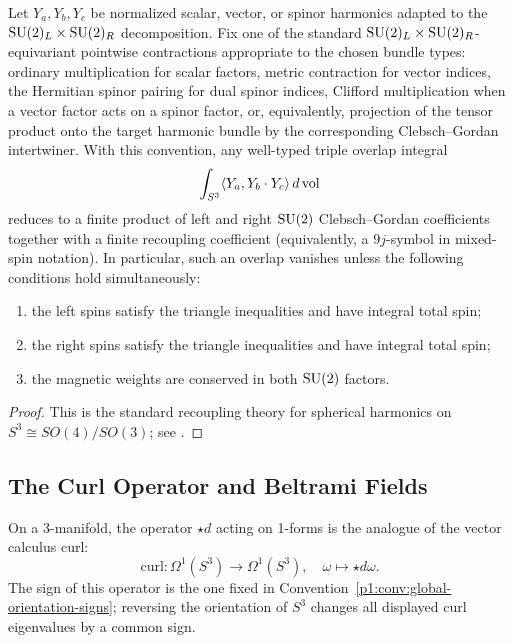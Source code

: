 \documentclass[11pt]{article}
\begin{document}
\begin{proposition}
\label{p1a:proposition:atlas-triple-overlap-coefficients-9f2b958}

Let \(Y_a,Y_b,Y_c\) be normalized scalar, vector, or spinor harmonics adapted to the \(\mathrm{SU}(2)_L\times \mathrm{SU}(2)_R\) decomposition.  Fix one of the standard \(\mathrm{SU}(2)_L\times\mathrm{SU}(2)_R\)-equivariant pointwise contractions appropriate to the chosen bundle types: ordinary multiplication for scalar factors, metric contraction for vector indices, the Hermitian spinor pairing for dual spinor indices, Clifford multiplication when a vector factor acts on a spinor factor, or, equivalently, projection of the tensor product onto the target harmonic bundle by the corresponding Clebsch--Gordan intertwiner.  With this convention, any well-typed triple overlap integral
\[
\int_{S^3} \langle Y_a,Y_b\cdot Y_c\rangle\, d\operatorname{vol}
\]
reduces to a finite product of left and right \(\mathrm{SU}(2)\) Clebsch--Gordan coefficients together with a finite recoupling coefficient (equivalently, a \(9j\)-symbol in mixed-spin notation).
In particular, such an overlap vanishes unless the following conditions hold simultaneously:
\begin{enumerate}[label=(\roman*)]
\item the left spins satisfy the triangle inequalities and have integral total spin;
\item the right spins satisfy the triangle inequalities and have integral total spin;
\item the magnetic weights are conserved in both \(\mathrm{SU}(2)\) factors.
\end{enumerate}
\end{proposition}

\begin{proof}
This is the standard recoupling theory for spherical harmonics on \(S^3\cong SO(4)/SO(3)\); see \cite{ishikiTakayamaTsuchiya2006S3,Camporesi1991}.
\end{proof}


\subsection{The Curl Operator and Beltrami Fields}

On a 3-manifold, the operator $\star d$ acting on 1-forms is the analogue of the vector calculus curl:
\[
\mathrm{curl}: \Omega^1(S^3) \to \Omega^1(S^3), \quad \omega \mapsto \star d\omega.
\]
The sign of this operator is the one fixed in Convention~\ref{p1:conv:global-orientation-signs}; reversing the orientation of $S^3$ changes all displayed curl eigenvalues by a common sign.
\end{document}
